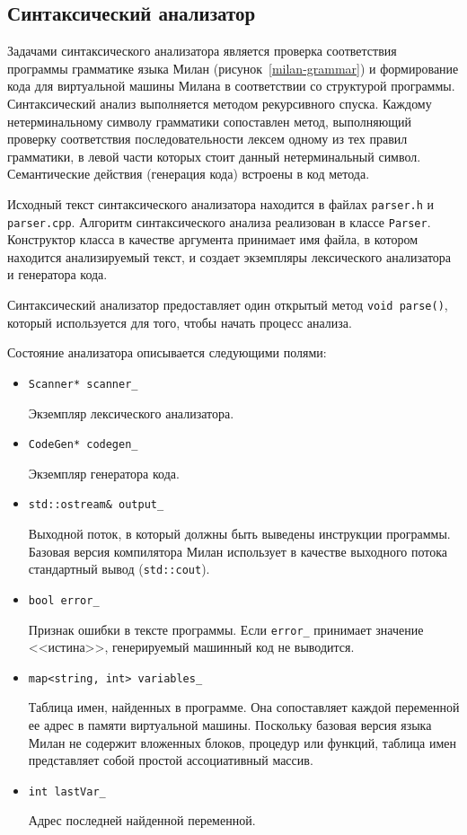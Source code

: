 \documentclass[a4paper,12pt]{article}
\begin{document}
\subsection{Синтаксический анализатор}

Задачами синтаксического анализатора является проверка соответствия программы
грамматике языка Милан (рисунок~\ref{milan-grammar}) и формирование кода для
виртуальной машины Милана в соответствии со структурой программы. Синтаксический
анализ выполняется методом рекурсивного спуска. Каждому нетерминальному символу
грамматики сопоставлен метод, выполняющий проверку соответствия
последовательности лексем одному из тех правил грамматики, в левой части которых
стоит данный нетерминальный символ. Семантические действия (генерация кода)
встроены в код метода.

Исходный текст синтаксического анализатора находится в файлах \texttt{parser.h}
и \texttt{parser.cpp}. Алгоритм синтаксического анализа реализован в классе
\texttt{Parser}. Конструктор класса в качестве аргумента принимает имя файла, в
котором находится анализируемый текст, и создает экземпляры лексического
анализатора и генератора кода.

Синтаксический анализатор предоставляет один открытый метод \texttt{void parse()},
который используется для того, чтобы начать процесс анализа.

Состояние анализатора описывается следующими полями:
\begin{itemize}
\item \texttt{Scanner* scanner\_}

      Экземпляр лексического анализатора.

\item \texttt{CodeGen* codegen\_}

      Экземпляр генератора кода.

\item \texttt{std::ostream\& output\_}

      Выходной поток, в который должны быть выведены инструкции программы.
      Базовая версия компилятора Милан использует в качестве выходного потока
      стандартный вывод (\texttt{std::cout}).

\item \texttt{bool error\_}

      Признак ошибки в тексте программы. Если \texttt{error\_} принимает
      значение <<истина>>, генерируемый машинный код не выводится.

\item \texttt{map<string, int> variables\_}

      Таблица имен, найденных в программе. Она сопоставляет каждой переменной ее
      адрес в памяти виртуальной машины. Поскольку базовая версия языка Милан не
      содержит вложенных блоков, процедур или функций, таблица имен представляет
      собой простой ассоциативный массив. 

\item \texttt{int lastVar\_}

      Адрес последней найденной переменной.
\end{itemize}
\end{document}
